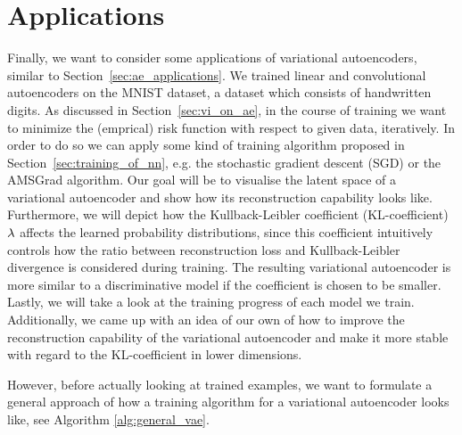 \section{Applications}\label{sec:vae_applications}

Finally, we want to consider some applications of variational autoencoders, similar to Section~\ref{sec:ae_applications}. We trained linear and convolutional autoencoders on the MNIST dataset, a dataset which consists of handwritten digits. As discussed in Section~\ref{sec:vi_on_ae}, in the course of training we want to minimize the (emprical) risk function with respect to given data, iteratively. In order to do so we can apply some kind of training algorithm proposed in Section~\ref{sec:training_of_nn}, e.g. the stochastic gradient descent (SGD) or the AMSGrad algorithm. Our goal will be to visualise the latent space of a variational autoencoder and show how its reconstruction capability looks like. Furthermore, we will depict how the Kullback-Leibler coefficient (KL-coefficient) $\lambda$ affects the learned probability distributions, since this coefficient intuitively controls how the ratio between reconstruction loss and Kullback-Leibler divergence is considered during training. The resulting variational autoencoder is \glqq more similar\grqq{} to a discriminative model if the coefficient is chosen to be smaller. Lastly, we will take a look at the training progress of each model we train. Additionally, we came up with an idea of our own of how to improve the reconstruction capability of the variational autoencoder and make it more stable with regard to the KL-coefficient in lower dimensions.

However, before actually looking at trained examples, we want to formulate a general approach of how a training algorithm for a variational autoencoder looks like, see Algorithm \ref{alg:general_vae}.

